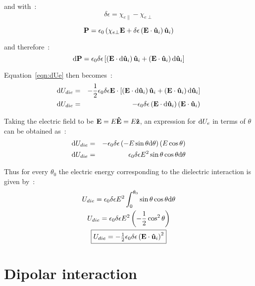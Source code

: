 and with~:
\begin{equation}
	\delta\epsilon =
		\chi_{e\parallel} - \chi_{e\perp} 
\end{equation}

\begin{equation}
	\mathbf{P} = \epsilon_0\left( \chi_{e\perp}\mathbf{E} +
	\delta\epsilon\left( \mathbf{E} \cdot \mathbf{\hat{u} }_i \right)\mathbf{\hat{u} }_i  \right)	
\end{equation}

and therefore~:
\begin{equation}
	\mathrm{d}\mathbf{P} = \epsilon_0\delta\epsilon\left[
	\left( \mathbf{E} \cdot \mathrm{d}\mathbf{\hat{u} }_i \right)\mathbf{\hat{u} }_i + \left( \mathbf{E} \cdot \mathbf{\hat{u} }_i \right)\mathrm{d}\mathbf{\hat{u} }_i
	\right]
\end{equation}

Equation~\ref{eqn:dUe} then becomes~:
\begin{eqnarray}
	\mathrm{d}U_{die} &=& -\frac{1}{2}\epsilon_0\delta\epsilon \mathbf{E}\cdot
		\left[
		\left( \mathbf{E} \cdot \mathrm{d}\mathbf{\hat{u} }_i \right)\mathbf{\hat{u} }_i + \left( \mathbf{E} \cdot \mathbf{\hat{u} }_i \right)\mathrm{d}\mathbf{\hat{u} }_i
		\right]	 \\
	\mathrm{d}U_{die} &=& -\epsilon_0\delta\epsilon
	\left( \mathbf{E} \cdot \mathrm{d}\mathbf{\hat{u} }_i \right)\left( \mathbf{E} \cdot \mathbf{\hat{u} }_i \right)
\end{eqnarray}

Taking the electric field to be $\mathbf{E} = E\mathbf{\hat{E} }=E\mathbf{\hat{z} }$, an expression for 
$\mathrm{d}U_e$ in terms of $\theta$ can be obtained as~:
%
\begin{eqnarray}
	\mathrm{d}U_{die} &=& -\epsilon_0\delta\epsilon\left( -E \sin\theta\mathrm{d}\theta\right)
		\left( E \cos\theta\right)	\\
	\mathrm{d}U_{die} &=& \epsilon_0\delta\epsilon E^2 \sin\theta\cos\theta\mathrm{d}\theta
\end{eqnarray}

Thus for every $\theta_0$ the electric energy corresponding to the dielectric interaction is
given by~:
\begin{gather}
	U_{die} = \epsilon_0\delta\epsilon E^2 \int^{\theta_0}_{0} 
		\sin\theta\cos\theta\mathrm{d}\theta  \\
	U_{die} = \epsilon_0\delta\epsilon E^2 \left( -\frac{1}{2}\cos^2\theta\right) \\
	\fbox{$U_{die} = -\frac{1}{2}\epsilon_0\delta\epsilon\left( \mathbf{E} \cdot \mathbf{\hat{u} }_i \right)^2$}
\end{gather}


\section{Dipolar interaction}

